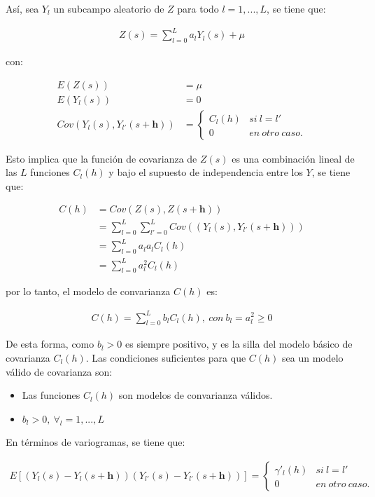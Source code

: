 \documentclass[
]{book}
\providecommand{\tightlist}{%
  \setlength{\itemsep}{0pt}\setlength{\parskip}{0pt}}
\begin{document}
Así, sea \(Y_l\) un subcampo aleatorio de \(Z\) para todo \(l=1,...,L\), se tiene que:

\begin{align}
  Z(s)=\sum_{l=0}^{L}a_lY_l(s)+\mu
\end{align}

con:

\begin{align}
    E(Z(s))&=\mu\\
    E(Y_l(s))&=0\\
    Cov(Y_l(s),Y_{l'}(s+\textbf{h}))&= \left \{ \begin{matrix} C_l(h) & si \ l=l'
\\ 0 & en\ otro\ caso.
\end{matrix}\right.  
\end{align}

Esto implica que la función de covarianza de \(Z(s)\) es una combinación lineal de las \(L\) funciones \(C_l(h)\) y bajo el supuesto de independencia entre los \(Y\), se tiene que:

\begin{align}
    C(h)&=Cov(Z(s),Z(s+\textbf{h}))\\
    &= \sum_{l=0}^L\sum_{l'=0}^L Cov((Y_l(s),Y_{l'}(s+\textbf{h}))) \\
    &=\sum_{l=0}^La_la_lC_l(h)\\
    &=\sum_{l=0}^La_l^2C_l(h)
\end{align}

por lo tanto, el modelo de convarianza \(C(h)\) es:

\begin{align}
  C(h)=\sum_{l=0}^Lb_lC_l(h),\ con\ b_l=a_l^2\geq 0  
\end{align}

De esta forma, como \(b_l>0\) es siempre positivo, y es la silla del modelo básico de covarianza \(C_l(h)\). Las condiciones suficientes para que \(C(h)\) sea un modelo válido de covarianza son:

\begin{itemize}
\tightlist
\item
  Las funciones \(C_l(h)\) son modelos de convarianza válidos.
\item
  \(b_l>0,\ \forall_l=1,...,L\)
\end{itemize}

En términos de variogramas, se tiene que:

\begin{align}
  E\left[ (Y_l(s)-Y_l(s+\textbf{h}))(Y_{l'}(s)-Y_{l'}(s+\textbf{h}))  \right]=\left \{ \begin{matrix} \gamma'_l(h) & si\ l=l'\\ 
0 & en\ otro\ caso. 
\end{matrix}\right.    
\end{align}
\end{document}
